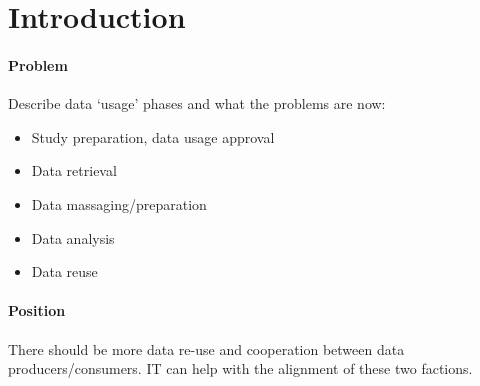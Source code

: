 \section{Introduction}
\paragraph{Problem}
Describe data `usage' phases and what the problems are now:
\begin{itemize}
	\item Study preparation, data usage approval
	\item Data retrieval
	\item Data massaging/preparation
	\item Data analysis
	\item Data reuse
\end{itemize}
\paragraph{Position}
There should be more data re-use and cooperation between data producers/consumers.
IT can help with the alignment of these two factions.


